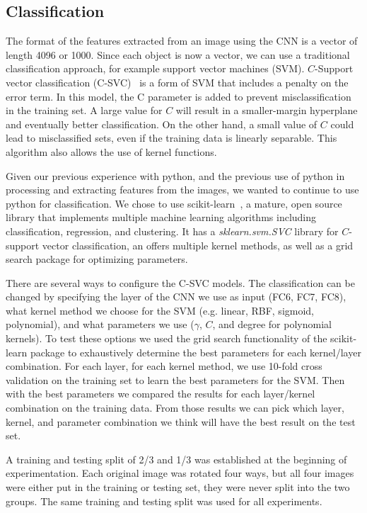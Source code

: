 \documentclass{article} %
\begin{document}
\subsection{Classification}
\label{sec:classification}
The format of the features extracted from an image using the CNN is a vector of length 4096 or 1000. Since each object is now a vector, we can use a traditional classification approach, for example support vector machines (SVM). $C$-Support vector classification (C-SVC)~\citep{boser1992training, cortes1995support} is a form of SVM that includes a penalty on the error term. In this model, the C parameter is added to prevent misclassification in the training set. A large value for $C$ will result in a smaller-margin hyperplane and eventually better classification. On the other hand, a small value of $C$ could lead to misclassified sets, even if the training data is linearly separable. This algorithm also allows the use of kernel functions.

Given our previous experience with python, and the previous use of python in processing and extracting features from the images, we wanted to continue to use python for classification. We chose to use scikit-learn~\citep{scikit-learn}, a mature, open source library that implements multiple machine learning algorithms including classification, regression, and clustering. It has a \emph{sklearn.svm.SVC} library for $C$-support vector classification, an offers multiple kernel methods, as well as a grid search package for optimizing parameters.

There are several ways to configure the C-SVC models. The classification can be changed by specifying the layer of the CNN we use as input (FC6, FC7, FC8), what kernel method we choose for the SVM (e.g. linear, RBF, sigmoid, polynomial), and what parameters we use ($\gamma$, $C$, and degree for polynomial kernels). To test these options we used the grid search functionality of the scikit-learn package to exhaustively determine the best parameters for each kernel/layer combination. For each layer, for each kernel method, we use 10-fold cross validation on the training set to learn the best parameters for the SVM. Then with the best parameters we compared the results for each layer/kernel combination on the training data. From those results we can pick which layer, kernel, and parameter combination we think will have the best result on the test set.

A training and testing split of 2/3 and 1/3 was established at the beginning of experimentation. Each original image was rotated four ways, but all four images were either put in the training or testing set, they were never split into the two groups. The same training and testing split was used for all experiments.
 
\end{document}
